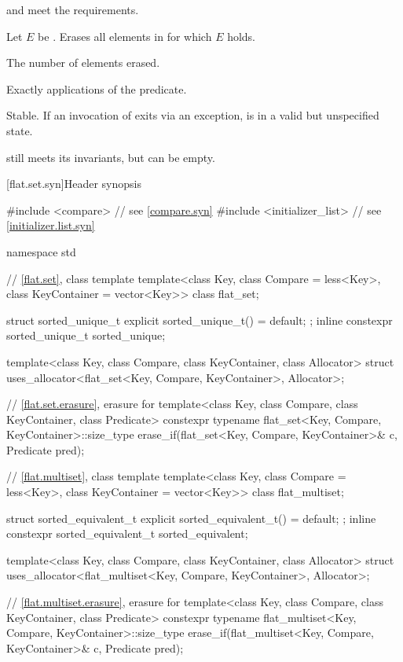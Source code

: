 \begin{itemdescr}
\pnum
\expects
{} and  meet the  requirements.

\pnum
\effects
Let $E$ be .
Erases all elements  in  for which $E$ holds.

\pnum
\returns
The number of elements erased.

\pnum
\complexity
Exactly  applications of the predicate.

\pnum
\remarks
Stable.
If an invocation of  exits via an exception,
 is in a valid but unspecified state.
\begin{note}
 still meets its invariants,
but can be empty.
\end{note}
\end{itemdescr}

[flat.set.syn]{Header  synopsis}%
%

\begin{codeblock}
#include <compare>              // see \ref{compare.syn}
#include <initializer_list>     // see \ref{initializer.list.syn}

namespace std {
  // \ref{flat.set}, class template 
  template<class Key, class Compare = less<Key>, class KeyContainer = vector<Key>>
    class flat_set;

  struct sorted_unique_t { explicit sorted_unique_t() = default; };
  inline constexpr sorted_unique_t sorted_unique{};

  template<class Key, class Compare, class KeyContainer, class Allocator>
    struct uses_allocator<flat_set<Key, Compare, KeyContainer>, Allocator>;

  // \ref{flat.set.erasure}, erasure for 
  template<class Key, class Compare, class KeyContainer, class Predicate>
    constexpr typename flat_set<Key, Compare, KeyContainer>::size_type
      erase_if(flat_set<Key, Compare, KeyContainer>& c, Predicate pred);

  // \ref{flat.multiset}, class template 
  template<class Key, class Compare = less<Key>, class KeyContainer = vector<Key>>
    class flat_multiset;

  struct sorted_equivalent_t { explicit sorted_equivalent_t() = default; };
  inline constexpr sorted_equivalent_t sorted_equivalent{};

  template<class Key, class Compare, class KeyContainer, class Allocator>
    struct uses_allocator<flat_multiset<Key, Compare, KeyContainer>, Allocator>;

  // \ref{flat.multiset.erasure}, erasure for 
  template<class Key, class Compare, class KeyContainer, class Predicate>
    constexpr typename flat_multiset<Key, Compare, KeyContainer>::size_type
      erase_if(flat_multiset<Key, Compare, KeyContainer>& c, Predicate pred);
}
\end{codeblock}

